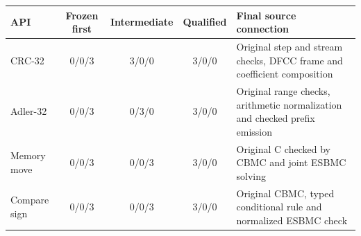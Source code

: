 \begin{tabularx}{\textwidth}{@{}lcccX@{}}\toprule
API & Frozen first & Intermediate & Qualified & Final source connection \\
\midrule
CRC-32 & 0/0/3 & 3/0/0 & 3/0/0 & Original step and stream checks, DFCC frame and coefficient composition\\
Adler-32 & 0/0/3 & 0/3/0 & 3/0/0 & Original range checks, arithmetic normalization and checked prefix emission\\
Memory move & 0/0/3 & 0/0/3 & 3/0/0 & Original C checked by CBMC and joint ESBMC solving\\
Compare sign & 0/0/3 & 0/0/3 & 3/0/0 & Original CBMC, typed conditional rule and normalized ESBMC check\\
\bottomrule\end{tabularx}
